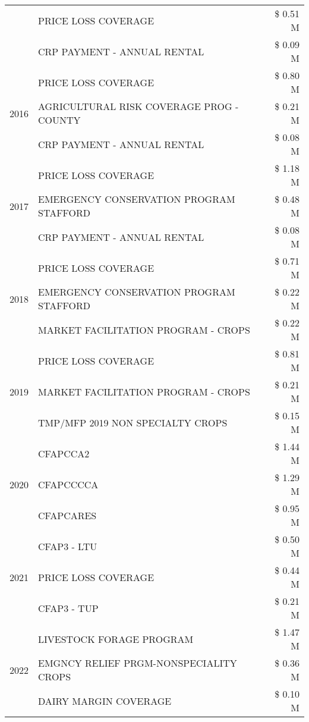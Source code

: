 \begin{tabular}{llr}
 & PRICE LOSS COVERAGE & \$ 0.51 M \\
 & CRP PAYMENT - ANNUAL RENTAL & \$ 0.09 M \\
\cline{1-3}
\multirow[t]{3}{*}{2016} & PRICE LOSS COVERAGE & \$ 0.80 M \\
 & AGRICULTURAL RISK COVERAGE PROG - COUNTY & \$ 0.21 M \\
 & CRP PAYMENT - ANNUAL RENTAL & \$ 0.08 M \\
\cline{1-3}
\multirow[t]{3}{*}{2017} & PRICE LOSS COVERAGE & \$ 1.18 M \\
 & EMERGENCY CONSERVATION PROGRAM STAFFORD & \$ 0.48 M \\
 & CRP PAYMENT - ANNUAL RENTAL & \$ 0.08 M \\
\cline{1-3}
\multirow[t]{3}{*}{2018} & PRICE LOSS COVERAGE & \$ 0.71 M \\
 & EMERGENCY CONSERVATION PROGRAM STAFFORD & \$ 0.22 M \\
 & MARKET FACILITATION PROGRAM - CROPS & \$ 0.22 M \\
\cline{1-3}
\multirow[t]{3}{*}{2019} & PRICE LOSS COVERAGE & \$ 0.81 M \\
 & MARKET FACILITATION PROGRAM - CROPS & \$ 0.21 M \\
 & TMP/MFP 2019 NON SPECIALTY CROPS & \$ 0.15 M \\
\cline{1-3}
\multirow[t]{3}{*}{2020} & CFAPCCA2 & \$ 1.44 M \\
 & CFAPCCCCA & \$ 1.29 M \\
 & CFAPCARES & \$ 0.95 M \\
\cline{1-3}
\multirow[t]{3}{*}{2021} & CFAP3 - LTU & \$ 0.50 M \\
 & PRICE LOSS COVERAGE & \$ 0.44 M \\
 & CFAP3 - TUP & \$ 0.21 M \\
\cline{1-3}
\multirow[t]{3}{*}{2022} & LIVESTOCK FORAGE PROGRAM & \$ 1.47 M \\
 & EMGNCY RELIEF PRGM-NONSPECIALITY CROPS & \$ 0.36 M \\
 & DAIRY MARGIN COVERAGE & \$ 0.10 M \\
\cline{1-3}
\bottomrule
\end{tabular}
